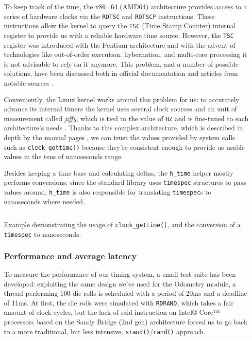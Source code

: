 \documentclass[a4paper,12pt]{report}
\begin{document}
To keep track of the time, the x86\_64 (AMD64) architecture provides access to a series of hardware clocks via the \texttt{RDTSC} and \texttt{RDTSCP} instructions. These instructions allow the kernel to query the \texttt{TSC} (Time Stamp Counter) internal register to provide us with a reliable hardware time source. However, the \texttt{TSC} register was introduced with the Pentium architecture and with the advent of technologies like out-of-order execution, hybernation, and multi-core processing it is not advisable to rely on it anymore. This problem, and a number of possible solutions, have been discussed both in official documentation \cite{intel-rdtsc-bench} and articles from notable sources \cite{ms-rdtsc-issues}.

Conveniently, the Linux kernel works around this problem for us: to accurately advance its internal timers the kernel uses several clock sources and an unit of measurement called \textit{jiffy}, which is tied to the value of \texttt{HZ} and is fine-tuned to each architecture's needs \cite{elinux-hrts}. Thanks to this complex architecture, which is described in depth by the manual pages \cite{man-clock-getres-2}, we can trust the values provided by system calls such as \texttt{clock\_gettime()} because they're consistent enough to provide us usable values in the tens of nanoseconds range.

Besides keeping a time base and calculating deltas, the \texttt{h\_time} helper mostly performs conversions: since the standard library uses \texttt{timespec} structures to pass values around, \texttt{h\_time} is also responsible for translating \texttt{timespec}s to nanoseconds where needed.  

\begin{listing}[H]
\inputminted[frame=single,framesep=10pt]{c}{snippets/time.c}
\caption{Example demonstrating the usage of \texttt{clock\_gettime()}, and the conversion of a \texttt{timespec} to nanoseconds.}
\end{listing}

\subsubsection{Performance and average latency}

To measure the performance of our timing system, a small test suite has been developed: exploiting the same design we've used for the Odometry module, a thread performing 100 die rolls is scheduled with a period of 20ms and a deadline of 11ms. At first, the die rolls were simulated with \texttt{RDRAND}, which takes a fair amount of clock cycles, but the lack of said instruction on Intel® Core™ processors based on the Sandy Bridge (2nd gen) architecture forced us to go back to a more traditional, but less intensive, \texttt{srand()}/\texttt{rand()} approach.
\end{document}
